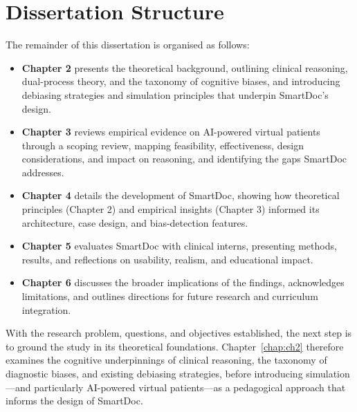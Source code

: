 \section{Dissertation Structure} 
\label{sec:structure}

The remainder of this dissertation is organised as follows:

\begin{itemize}
    \item \textbf{Chapter 2} presents the theoretical background, outlining
    clinical reasoning, dual-process theory, and the taxonomy of cognitive
    biases, and introducing debiasing strategies and simulation principles that
    underpin SmartDoc’s design.
    \item \textbf{Chapter 3} reviews empirical evidence on AI-powered virtual
    patients through a scoping review, mapping feasibility, effectiveness,
    design considerations, and impact on reasoning, and identifying the gaps
    SmartDoc addresses.
    \item \textbf{Chapter 4} details the development of SmartDoc, showing how
    theoretical principles (Chapter 2) and empirical insights (Chapter 3)
    informed its architecture, case design, and bias-detection features.
    \item \textbf{Chapter 5} evaluates SmartDoc with clinical interns, presenting
    methods, results, and reflections on usability, realism, and educational
    impact.
    \item \textbf{Chapter 6} discusses the broader implications of the findings,
    acknowledges limitations, and outlines directions for future research and
    curriculum integration.
\end{itemize}

\noindent With the research problem, questions, and objectives established,
the next step is to ground the study in its theoretical foundations.
Chapter~\ref{chap:ch2} therefore examines the cognitive underpinnings of
clinical reasoning, the taxonomy of diagnostic biases, and existing debiasing
strategies, before introducing simulation—and particularly AI-powered virtual
patients—as a pedagogical approach that informs the design of SmartDoc.

